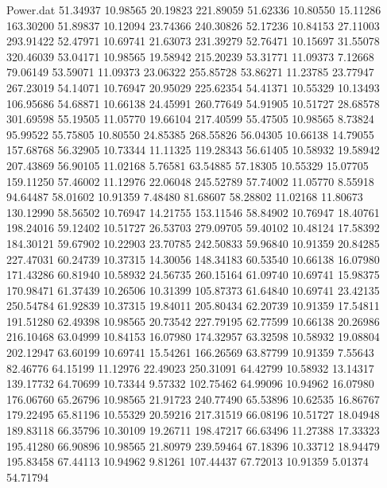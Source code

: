\begin{filecontents}{Power.dat}
  51.34937   10.98565   20.19823  221.89059
  51.62336   10.80550   15.11286  163.30200
  51.89837   10.12094   23.74366  240.30826
  52.17236   10.84153   27.11003  293.91422
  52.47971   10.69741   21.63073  231.39279
  52.76471   10.15697   31.55078  320.46039
  53.04171   10.98565   19.58942  215.20239
  53.31771   11.09373    7.12668   79.06149
  53.59071   11.09373   23.06322  255.85728
  53.86271   11.23785   23.77947  267.23019
  54.14071   10.76947   20.95029  225.62354
  54.41371   10.55329   10.13493  106.95686
  54.68871   10.66138   24.45991  260.77649
  54.91905   10.51727   28.68578  301.69598
  55.19505   11.05770   19.66104  217.40599
  55.47505   10.98565    8.73824   95.99522
  55.75805   10.80550   24.85385  268.55826
  56.04305   10.66138   14.79055  157.68768
  56.32905   10.73344   11.11325  119.28343
  56.61405   10.58932   19.58942  207.43869
  56.90105   11.02168    5.76581   63.54885
  57.18305   10.55329   15.07705  159.11250
  57.46002   11.12976   22.06048  245.52789
  57.74002   11.05770    8.55918   94.64487
  58.01602   10.91359    7.48480   81.68607
  58.28802   11.02168   11.80673  130.12990
  58.56502   10.76947   14.21755  153.11546
  58.84902   10.76947   18.40761  198.24016
  59.12402   10.51727   26.53703  279.09705
  59.40102   10.48124   17.58392  184.30121
  59.67902   10.22903   23.70785  242.50833
  59.96840   10.91359   20.84285  227.47031
  60.24739   10.37315   14.30056  148.34183
  60.53540   10.66138   16.07980  171.43286
  60.81940   10.58932   24.56735  260.15164
  61.09740   10.69741   15.98375  170.98471
  61.37439   10.26506   10.31399  105.87373
  61.64840   10.69741   23.42135  250.54784
  61.92839   10.37315   19.84011  205.80434
  62.20739   10.91359   17.54811  191.51280
  62.49398   10.98565   20.73542  227.79195
  62.77599   10.66138   20.26986  216.10468
  63.04999   10.84153   16.07980  174.32957
  63.32598   10.58932   19.08804  202.12947
  63.60199   10.69741   15.54261  166.26569
  63.87799   10.91359    7.55643   82.46776
  64.15199   11.12976   22.49023  250.31091
  64.42799   10.58932   13.14317  139.17732
  64.70699   10.73344    9.57332  102.75462
  64.99096   10.94962   16.07980  176.06760
  65.26796   10.98565   21.91723  240.77490
  65.53896   10.62535   16.86767  179.22495
  65.81196   10.55329   20.59216  217.31519
  66.08196   10.51727   18.04948  189.83118
  66.35796   10.30109   19.26711  198.47217
  66.63496   11.27388   17.33323  195.41280
  66.90896   10.98565   21.80979  239.59464
  67.18396   10.33712   18.94479  195.83458
  67.44113   10.94962    9.81261  107.44437
  67.72013   10.91359    5.01374   54.71794

\end{filecontents}
